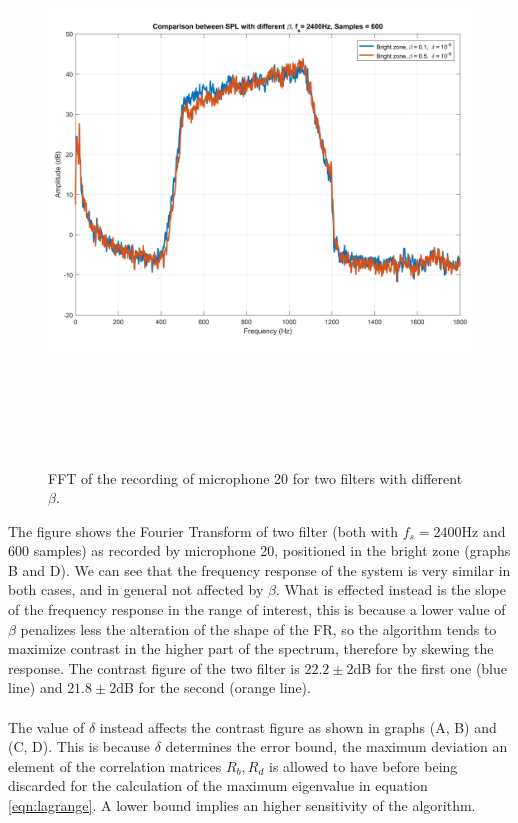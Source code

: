 \begin{figure}[H]
\centering
\includegraphics[width=14.5cm,height=15cm,keepaspectratio]{Figures/filter_25vs65}
\decoRule
\caption[FFT filters same delta]{FFT of the recording of microphone 20 for two filters with different $\beta$.}
\label{fig:filter_25vs65}
\end{figure}

The figure shows the Fourier Transform of two filter (both with $f_s = 2400$Hz and $600$ samples) as recorded by microphone 20, positioned in the bright zone (graphs B and D). We can see that the frequency response of the system is very similar in both cases, and in general not affected by $\beta$. What is effected instead is the slope of the frequency response in the range of interest, this is because a lower value of $\beta$ penalizes less the alteration of the shape of the FR, so the algorithm tends to maximize contrast in the higher part of the spectrum, therefore by skewing the response. The contrast figure of the two filter is $22.2\pm2$dB for the first one (blue line) and $21.8\pm2$dB for the second (orange line).
\\
\\
The value of $\delta$ instead affects the contrast figure as shown in graphs (A, B) and (C, D). This is because $\delta$ determines the error bound, the maximum deviation an element of the correlation matrices $R_b, R_d$ is allowed to have before being discarded for the calculation of the maximum eigenvalue in equation \ref{eqn:lagrange}. A lower bound implies an higher sensitivity of the algorithm. 


